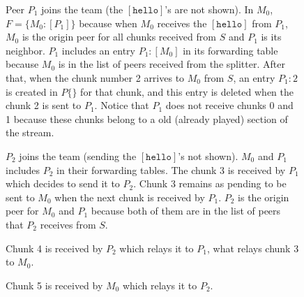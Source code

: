 \begin{figure}
   \caption{Peer $P_1$ joins the team (the
    $[\mathtt{hello}]$'s are not shown). In $M_0$, $F=\{M_0:[P_1]\}$
    because when $M_0$ receives the $[\mathtt{hello}]$ from $P_1$,
    $M_0$ is the origin peer for all chunks received from $S$ and
    $P_1$ is its neighbor. $P_1$ includes an entry $P_1:[M_0]$ in its
    forwarding table because $M_0$ is in the list of peers received
    from the splitter. After that, when the chunk number 2 arrives
    to $M_0$ from $S$, an entry $P_1:2$ is created in $P\{\}$ for that
    chunk, and this entry is deleted when the chunk 2 is sent to
    $P_1$. Notice that $P_1$ does not receive chunks 0 and 1
    because these chunks belong to a old (already played) section of
    the stream.\label{fig:team_1}}
\end{figure}

\begin{figure}
   \caption{$P_2$ joins the team (sending the
    $[\mathtt{hello}]$'s not shown). $M_0$ and $P_1$ includes $P_2$ in
    their forwarding tables. The chunk 3 is received by $P_1$ which
    decides to send it to $P_2$. Chunk 3 remains as pending to be sent
    to $M_0$ when the next chunk is received by $P_1$. $P_2$ is the
    origin peer for $M_0$ and $P_1$ because both of them are in the
    list of peers that $P_2$ receives from $S$. \label{fig:team_2}}
\end{figure}

\begin{figure}
   \caption{Chunk 4 is received by $P_2$ which
    relays it to $P_1$, what relays chunk 3 to
    $M_0$.\label{fig:team_3}}
\end{figure}

\begin{figure}
   \caption{Chunk 5 is received by $M_0$ which
    relays it to $P_2$.\label{fig:team_4}}
\end{figure}

